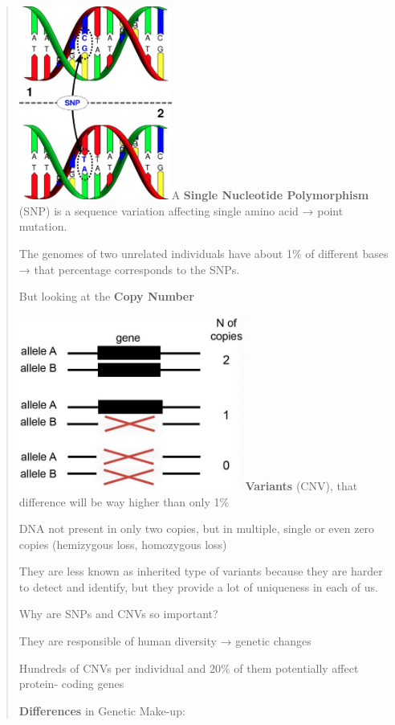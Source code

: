 \begin{quote}
\includegraphics[width=1.97816in,height=2.50248in]{image2.jpeg}A
\textbf{Single Nucleotide Polymorphism} (SNP) is a sequence variation
affecting single amino acid → point mutation.

The genomes of two unrelated individuals have about 1\% of different
bases → that percentage corresponds to the SNPs.

But looking at the \textbf{Copy Number}

\includegraphics[width=2.93475in,height=2.26167in]{image3.jpeg}\textbf{Variants}
(CNV), that difference will be way higher than only 1\%

DNA not present in only two copies, but in multiple, single or even zero
copies (hemizygous loss, homozygous loss)

They are less known as inherited type of variants because they are
harder to detect and identify, but they provide a lot of uniqueness in
each of us.

Why are SNPs and CNVs so important?

They are responsible of human diversity → genetic changes

Hundreds of CNVs per individual and 20\% of them potentially affect
protein- coding genes

\textbf{Differences} in Genetic Make-up:


\end{quote}
